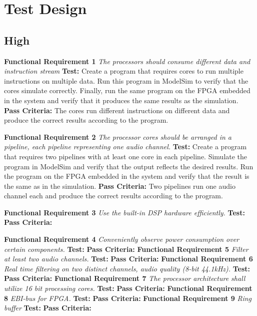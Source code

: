 \section{Test Design}

\subsection{High}

\textbf{Functional Requirement 1}
\textit{The processors should consume different data and instruction stream}
\textbf{Test:}
Create a program that requires cores to run multiple instructions on multiple data. 
Run this program in ModelSim to verify that the cores simulate correctly. 
Finally, run the same program on the FPGA embedded in the system and verify that it produces the same results as the simulation.
\textbf{Pass Criteria:}
The cores run different instructions on different data and produce the correct results according to the program. 

\textbf{Functional Requirement 2}
\textit{The processor cores should be arranged in a pipeline, each pipeline representing one audio channel.}
\textbf{Test:}
Create a program that requires two pipelines with at least one core in each pipeline. 
Simulate the program in ModelSim and verify that the output reflects the desired results.
Run the program on the FPGA embedded in the system and verify that the result is the same as in the simulation.
\textbf{Pass Criteria:}
Two pipelines run one audio channel each and produce the correct results according to the program.


\textbf{Functional Requirement 3}
\textit{Use the built-in DSP hardware efficiently.}
\textbf{Test:}
\textbf{Pass Criteria:}


\textbf{Functional Requirement 4}
\textit{Conveniently observe power consumption over certain components.}
\textbf{Test:}
\textbf{Pass Criteria:}
\textbf{Functional Requirement 5}
\textit{Filter at least two audio channels.}
\textbf{Test:}
\textbf{Pass Criteria:}
\textbf{Functional Requirement 6}
\textit{Real time filtering on two distinct channels, audio quality (8-bit 44.1kHz).}
\textbf{Test:}
\textbf{Pass Criteria:}
\textbf{Functional Requirement 7}
\textit{The processor architecture shall utilize 16 bit processing cores.}
\textbf{Test:}
\textbf{Pass Criteria:}
\textbf{Functional Requirement 8}
\textit{EBI-bus for FPGA.}
\textbf{Test:}
\textbf{Pass Criteria:}
\textbf{Functional Requirement 9}
\textit{Ring buffer}
\textbf{Test:}
\textbf{Pass Criteria:}


